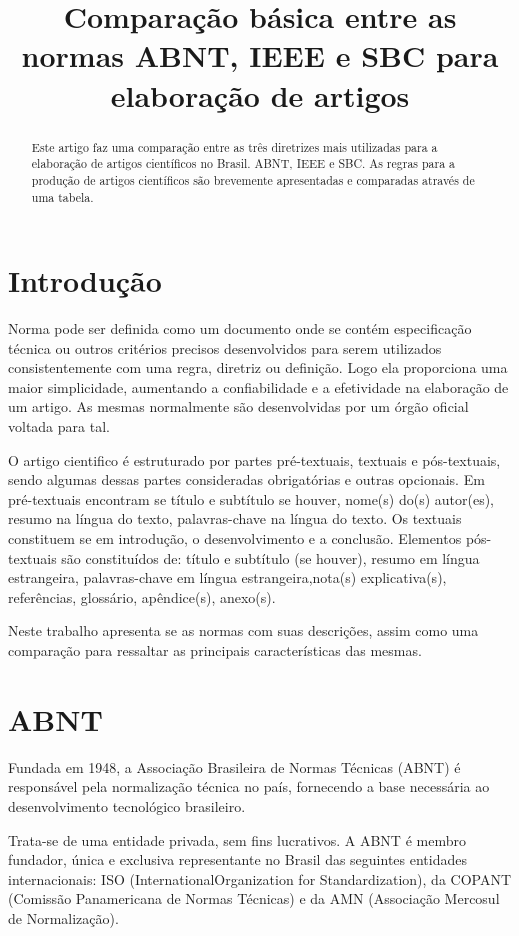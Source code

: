 \documentclass[conference]{IEEEtran}
\title{Comparação básica entre as normas ABNT, IEEE e SBC para elaboração de artigos}
\author{
	\IEEEauthorblockN{CASELLA, G. B.\IEEEauthorrefmark{1}, HAN, L. Y.\IEEEauthorrefmark{2}, CARVALHO, W.\IEEEauthorrefmark{3}}
	\IEEEauthorblockA{ %
		Departamento de Ciência da Computação\\
		UTFPR, Ponta Grossa, Paran\'a\\
	\{\IEEEauthorrefmark{1}gbc921,
	\IEEEauthorrefmark{2}nilyuhan,
	\IEEEauthorrefmark{3}wevertoncarvalho34\}@gmail.com}
}
\begin{document}
 

\maketitle

\begin{abstract}
Este artigo faz uma comparação entre as três diretrizes mais utilizadas para a elaboração de artigos científicos no Brasil. ABNT, IEEE e SBC. As regras para a produção de artigos científicos são brevemente apresentadas e comparadas através de uma tabela.
\end{abstract}

\section{Introdução}	
Norma pode ser definida como um documento onde se contém especificação técnica ou outros critérios precisos desenvolvidos para serem utilizados consistentemente com uma regra, diretriz ou definição. Logo ela proporciona uma maior simplicidade, aumentando a confiabilidade e a efetividade na elaboração de um artigo. As mesmas normalmente são desenvolvidas por um órgão oficial voltada para tal.

O artigo cientifico é estruturado  por partes pré-textuais, textuais e pós-textuais, sendo algumas dessas partes consideradas obrigatórias e outras opcionais. Em pré-textuais encontram se título e subtítulo se houver, nome(s) do(s) autor(es), resumo na língua do texto, palavras-chave na língua do texto. Os textuais constituem se em  introdução, o desenvolvimento e a conclusão. Elementos pós-textuais são constituídos de: título e subtítulo (se houver), resumo em língua estrangeira, palavras-chave em língua estrangeira,nota(s) explicativa(s), referências, glossário, apêndice(s), anexo(s).

Neste trabalho apresenta se as normas com suas descrições, assim como  uma comparação para ressaltar as principais características das mesmas.

\section{ABNT}
Fundada em 1948, a Associação Brasileira de Normas Técnicas (ABNT) é responsável pela normalização técnica no país, fornecendo a base necessária ao desenvolvimento tecnológico brasileiro\cite{ABNT:NBR6022}.

Trata-se de uma entidade privada, sem fins lucrativos. A ABNT é membro fundador, única e exclusiva representante no Brasil das seguintes entidades internacionais: ISO (InternationalOrganization for Standardization), da COPANT (Comissão Panamericana de Normas Técnicas) e da AMN (Associação Mercosul de Normalização)\cite{ABNT:NBR6022}.
\end{document}
